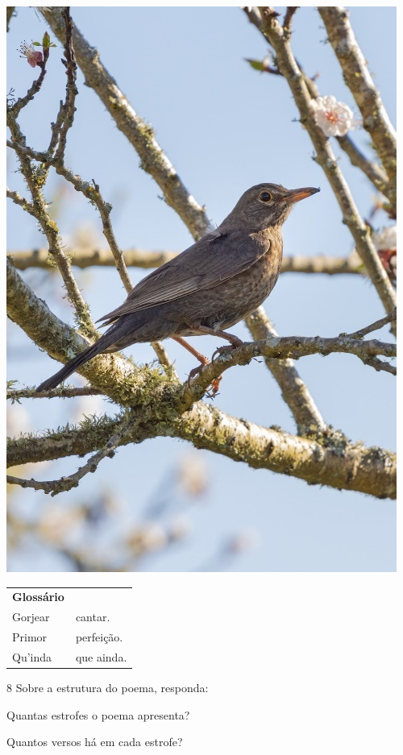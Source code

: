 \begin{minipage}{.5\textwidth}
\includegraphics[width=\textwidth]{./imgs/img17.jpg}
\end{minipage}

\begin{tabular}{ll}
\textbf{Glossário} & \mbox{}\\
Gorjear & cantar.\\
Primor & perfeição.\\
Qu'inda & que ainda.\\
\end{tabular}

\pagebreak
\num{8} Sobre a estrutura do poema, responda:

\begin{escolha}
\item Quantas estrofes o poema apresenta?\\

\item Quantos versos há em cada estrofe?\\
\end{escolha}


